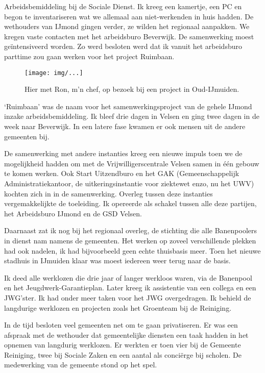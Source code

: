 \documentclass[10pt,twoside,openright]{memoir}
\begin{document}
Arbeidsbemiddeling bij de Sociale Dienst. Ik kreeg een kamertje, een PC en begon te inventariseren wat we allemaal aan niet-werkenden in huis hadden. De wethouders van IJmond gingen verder, ze wilden het regionaal aanpakken. We kregen vaste contacten met het arbeidsburo Beverwijk. De samenwerking moest geïntensiveerd worden. Zo werd besloten werd dat ik vanuit het arbeidsburo parttime zou gaan werken voor het project Ruimbaan.

\begin{figure}[t]
\texttt{[image: img/...]}
\caption{Hier met Ron, m’n chef, op bezoek bij een project in Oud-IJmuiden.}
\end{figure}

`Ruimbaan' was de naam voor het samenwerkingsproject van de gehele IJmond inzake arbeidsbemiddeling. Ik bleef drie dagen in Velsen en ging twee dagen in de week naar Beverwijk. In een latere fase kwamen er ook mensen uit de andere gemeenten bij. 

De samenwerking met andere instanties kreeg een nieuwe impuls toen we de mogelijkheid hadden om met de Vrijwilligerscentrale Velsen samen in één gebouw te komen werken. Ook Start Uitzendburo en het GAK (Gemeenschappelijk Administratiekantoor, de uitkeringsinstantie voor ziektewet enzo, nu het UWV) kochten zich in in de samenwerking. Overleg tussen deze instanties vergemakkelijkte de toeleiding. Ik opereerde als schakel tussen alle deze partijen, het Arbeidsburo IJmond en de GSD Velsen. 

Daarnaast zat ik nog bij het regionaal overleg, de stichting die alle Banenpoolers in dienst nam namens de gemeenten. Het werken op zoveel verschillende plekken had ook nadelen, ik had bijvoorbeeld geen echte thuisbasis meer. Toen het nieuwe stadhuis in IJmuiden klaar was moest iedereen weer terug naar de basis. 

Ik deed alle werklozen die drie jaar of langer werkloos waren, via de Banenpool en het Jeugdwerk-Garantieplan. Later kreeg ik assistentie van een collega en een JWG’ster. Ik had onder meer taken voor het JWG overgedragen. Ik behield de langdurige werklozen en projecten zoals het Groenteam bij de Reiniging. 

In de tijd besloten veel gemeenten net om te gaan privatiseren. Er was een afspraak met de wethouder dat gemeentelijke diensten een taak hadden in het opnemen van langdurig werklozen. Er werkten er toen vier bij de Gemeente Reiniging, twee bij Sociale Zaken en een aantal als conciërge bij scholen. De medewerking van de gemeente stond op het spel. 
\end{document}
